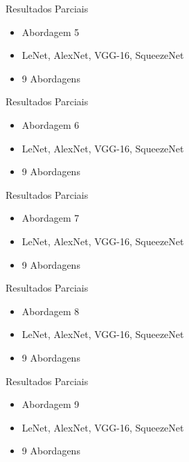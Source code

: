 \begin{frame}{Resultados Parciais}
 \begin{itemize}
   \item Abordagem 5
   \item LeNet, AlexNet, VGG-16, SqueezeNet
   \ \ \newline
   \item \alert{9 Abordagens}
   \end{itemize}
\end{frame}

\begin{frame}{Resultados Parciais}
 \begin{itemize}
   \item Abordagem 6
   \item LeNet, AlexNet, VGG-16, SqueezeNet
   \ \ \newline
   \item \alert{9 Abordagens}
   \end{itemize}
\end{frame}

\begin{frame}{Resultados Parciais}
 \begin{itemize}
   \item Abordagem 7
   \item LeNet, AlexNet, VGG-16, SqueezeNet
   \ \ \newline
   \item \alert{9 Abordagens}
   \end{itemize}
\end{frame}

\begin{frame}{Resultados Parciais}
 \begin{itemize}
   \item Abordagem 8
   \item LeNet, AlexNet, VGG-16, SqueezeNet
   \ \ \newline
   \item \alert{9 Abordagens}
   \end{itemize}
\end{frame}

\begin{frame}{Resultados Parciais}
 \begin{itemize}
   \item Abordagem 9
   \item LeNet, AlexNet, VGG-16, SqueezeNet
   \ \ \newline
   \item \alert{9 Abordagens}
   \end{itemize}
\end{frame}
